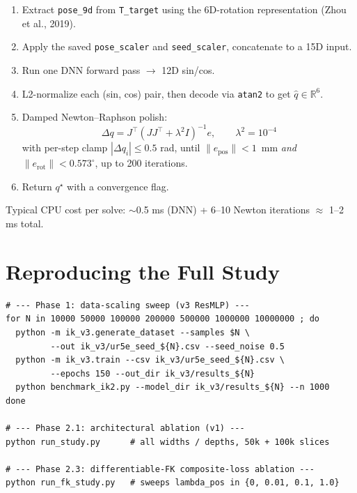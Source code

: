\documentclass[11pt]{article}
\begin{document}
\begin{enumerate}[leftmargin=*]
    \item Extract \texttt{pose\_9d} from \texttt{T\_target} using the
          6D-rotation representation (Zhou et al., 2019).
    \item Apply the saved \texttt{pose\_scaler} and \texttt{seed\_scaler},
          concatenate to a 15D input.
    \item Run one DNN forward pass $\rightarrow$ 12D sin/cos.
    \item L2-normalize each (sin, cos) pair, then decode via
          \texttt{atan2} to get $\hat q \in \mathbb{R}^6$.
    \item Damped Newton--Raphson polish:
          \[
              \Delta q = J^{\top}\left(J J^{\top} + \lambda^2 I\right)^{-1} e,
              \qquad \lambda^2 = 10^{-4}
          \]
          with per-step clamp $|\Delta q_i| \leq 0.5$ rad, until
          $\|e_\text{pos}\| < 1$~mm \emph{and}
          $\|e_\text{rot}\| < 0.573^\circ$, up to 200 iterations.
    \item Return $q^\star$ with a convergence flag.
\end{enumerate}

Typical CPU cost per solve: $\sim$0.5 ms (DNN) + 6--10 Newton iterations
$\approx$ 1--2 ms total.

\section{Reproducing the Full Study}

\begin{lstlisting}[style=shell]
# --- Phase 1: data-scaling sweep (v3 ResMLP) ---
for N in 10000 50000 100000 200000 500000 1000000 10000000 ; do
  python -m ik_v3.generate_dataset --samples $N \
         --out ik_v3/ur5e_seed_${N}.csv --seed_noise 0.5
  python -m ik_v3.train --csv ik_v3/ur5e_seed_${N}.csv \
         --epochs 150 --out_dir ik_v3/results_${N}
  python benchmark_ik2.py --model_dir ik_v3/results_${N} --n 1000
done

# --- Phase 2.1: architectural ablation (v1) ---
python run_study.py      # all widths / depths, 50k + 100k slices

# --- Phase 2.3: differentiable-FK composite-loss ablation ---
python run_fk_study.py   # sweeps lambda_pos in {0, 0.01, 0.1, 1.0}
\end{lstlisting}
\end{document}

